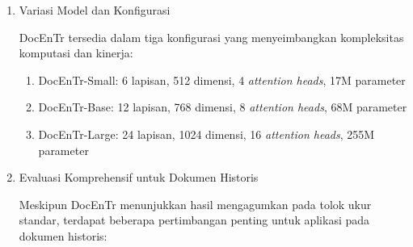 \documentclass[12pt,a4paper]{article}
\begin{document}
\begin{enumerate}[leftmargin=*, labelindent=0pt, itemsep=1ex, topsep=0pt]
\begin{enumerate}[leftmargin=1.5em, labelsep=0.5em, itemindent=0pt, label=\alph*., topsep=0pt, parsep=0pt, itemsep=0pt]
      \item Tanpa \textit{Inductive Bias}: \mbox{}\\[0.1em]
            Tanpa \textit{inductive bias} konvolusional, model dapat mempelajari representasi yang lebih fleksibel dan tidak terbatas pada pola lokal.

      \item Kinerja Superior: \mbox{}\\[0.1em]
            Pada tolok ukur DIBCO, DocEnTr mencapai kinerja \textit{state-of-the-art} dengan PSNR signifikan lebih tinggi dibandingkan metode berbasis CNN.
\end{enumerate}

\item Variasi Model dan Konfigurasi

DocEnTr tersedia dalam tiga konfigurasi yang menyeimbangkan kompleksitas komputasi dan kinerja:

\begin{enumerate}[leftmargin=1.5em, labelsep=0.5em, itemindent=0pt, label=\alph*., topsep=0pt, parsep=0pt, itemsep=0pt]
      \item DocEnTr-Small: 6 lapisan, 512 dimensi, 4 \textit{attention heads}, 17M parameter
      \item DocEnTr-Base: 12 lapisan, 768 dimensi, 8 \textit{attention heads}, 68M parameter
      \item DocEnTr-Large: 24 lapisan, 1024 dimensi, 16 \textit{attention heads}, 255M parameter
\end{enumerate}

\item Evaluasi Komprehensif untuk Dokumen Historis

Meskipun DocEnTr menunjukkan hasil mengagumkan pada tolok ukur standar, terdapat beberapa pertimbangan penting untuk aplikasi pada dokumen historis:


\end{enumerate}
\end{document}
